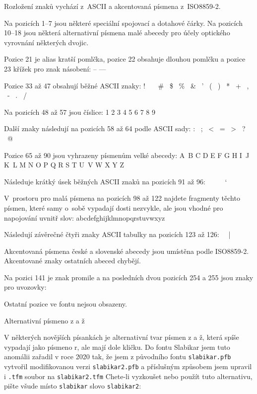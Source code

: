 Rozložení znaků vychází z~ASCII a akcentovaná písmena z~ISO8859-2.

Na pozicích 1--7 jsou některé speciální spojovací a dotahové čárky.
Na pozicích 10--18 jsou některá alternativní písmena malé abecedy pro účely
optického vyrovnání některých dvojic.

Pozice 21 je  alias kratší pomlčka, pozice 22 obsahuje dlouhou
pomlčku a pozice 23 křížek pro znak násobení:
\bigskip
{\pis -- --- }
\bigskip

Pozice 33 až 47 obsahují běžné ASCII znaky:
\bigskip
{\pis ! \ \ \ \# \ \$ \ \% \ \& \ ' \ ( \ ) \ * \ + \ , \ - \ . \ /}
\bigskip

Na pozicích 48 až 57 jsou číslice:
\bigskip
{ 1 2 3 4 5 6 7 8 9}
\bigskip

Další znaky následují na pozicích 58 až 64 podle ASCII sady:
\bigskip
{\pis : \ ; \ < \ = \ > \ ? \ @}
\bigskip

Pozice 65 až 90 jsou vyhrazeny písmenům velké abecedy:
\bigskip
{\pis A~B C D E F\/ G H I~J K~L M N O\/ P\/ Q R S\/ T\/ U~V\/ W\/ X Y Z}
\bigskip

Následuje krátký úsek běžných ASCII znaků na pozicích 91 až 96:
\bigskip
{\pis [ \ \char92\ \ ] \ \ \ \ \ `}
\bigskip

V~prostoru pro malá písmena na pozicích 98 až 122 najdete fragmenty těchto
písmen, které samy o~sobě vypadají dosti nezvykle, ale jsou vhodné pro
napojování uvnitř slov:
\bigskip
{\pis abcdefghijklmnopqrstuvwxyz}
\bigskip

Následují závěrečné čtyři znaky ASCII tabulky na pozicích 123 až 126:
\bigskip
{\pis {}\ \ | \ \ \ }
\bigskip

Akcentovaná písmena české a slovenské abecedy jsou umístěna podle ISO8859-2.
Akcentované znaky ostatních abeced chybějí. 

Na pozici 141 je znak promile a na posledních dvou pozicích 254 a 255 jsou
znaky pro uvozovky:
\bigskip
{\pis {}\ \ \ \ }
\bigskip

Ostatní pozice ve fontu nejsou obsazeny.

\sub Alternativní písmeno z a ž

V některých novějších písankách je alternativní tvar písmen z a ž, která spíše
vypadají jako písmeno r, ale mají dole kličku. Do fontu Slabikar jsem tuto
anomálii zařadil v roce 2020 tak, že jsem z původního fontu {\tt slabikar.pfb} vytvořil
modifikovanou verzi {\tt slabikar2.pfb} a příslušným způsobem jsem upravil i
{\tt.tfm} soubor na {\tt slabikar2.tfm} Chete-li vyzkoušet nebo použít tuto 
alternativu, pište všude místo {\tt slabikar} slovo {\tt slabikar2}:

